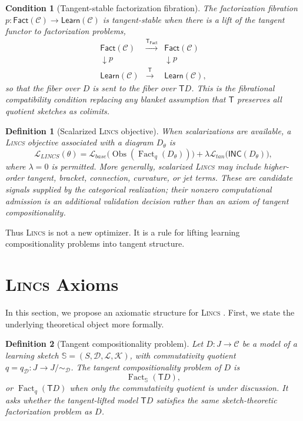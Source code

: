 \documentclass{article}
\newtheorem{definition}{Definition}
\newtheorem{condition}{Condition}
\newcommand{\C}{\mathcal{C}}
\newcommand{\T}{\mathsf{T}}
\newcommand{\INC}{\mathsf{INC}}
\newcommand{\Loss}{\mathcal{L}}
\newcommand{\Fact}{\operatorname{Fact}}
\newcommand{\Obs}{\operatorname{Obs}}
\begin{document}
\begin{condition}[Tangent-stable factorization fibration]
The factorization fibration \(p:\mathsf{Fact}(\C)\to\mathsf{Learn}(\C)\) is tangent-stable when there is a lift of the tangent functor to factorization problems,
\[
\begin{array}{ccc}
\mathsf{Fact}(\C) & \xrightarrow{\T_{\mathsf{Fact}}} & \mathsf{Fact}(\C)\\
\downarrow p && \downarrow p\\
\mathsf{Learn}(\C) & \xrightarrow{\T} & \mathsf{Learn}(\C),
\end{array}
\]
so that the fiber over \(D\) is sent to the fiber over \(\T D\). This is the fibrational compatibility condition replacing any blanket assumption that \(\T\) preserves all quotient sketches as colimits.
\end{condition}

\begin{definition}[Scalarized \textsc{Lincs}   objective]
When scalarizations are available, a \textsc{Lincs}   objective associated with a diagram \(D_\theta\) is
\[
\Loss_{LINCS}(\theta)
  =
  \Loss_{base}\big(\Obs(\Fact_q(D_\theta))\big)
  +
  \lambda\Loss_{tan}\big(\INC(D_\theta)\big),
\]
where $\lambda=0$ is permitted. More generally, scalarized \textsc{Lincs}
may include higher-order tangent, bracket, connection, curvature, or jet terms.
These are candidate signals supplied by the categorical realization; their
nonzero computational admission is an additional validation decision rather
than an axiom of tangent compositionality.
\end{definition}

Thus \textsc{Lincs}   is not a new optimizer. It is a rule for lifting learning compositionality problems into tangent structure.

\section{\textsc{Lincs}   Axioms}

In this section, we propose an axiomatic structure for \textsc{Lincs}  . First, we state the underlying theoretical object more formally. 

\begin{definition}[Tangent compositionality problem]
Let \(D:J\to\C\) be a model of a learning sketch \(\mathbb S=(S,\mathcal D,\mathcal L,\mathcal K)\), with commutativity quotient \(q=q_{\mathcal D}:J\to J/{\sim_{\mathcal D}}\). The tangent compositionality problem of \(D\) is
\[
\Fact_{\mathbb S}(\T D),
\]
or \(\Fact_q(\T D)\) when only the commutativity quotient is under discussion. It asks whether the tangent-lifted model \(\T D\) satisfies the same sketch-theoretic factorization problem as \(D\).
\end{definition}
\end{document}
